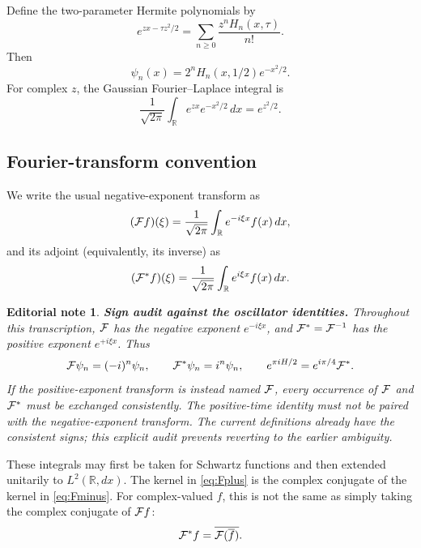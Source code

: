 \documentclass[11pt]{amsart}
\newcommand{\RR}{\mathbb R}
\newcommand{\F}{{\cal F}}
\newcommand{\Fstar}{{\cal F}^{*}}
\newcommand{\dd}{\,dx}
\newtheorem*{editorial}{Editorial note}
\begin{document}
Define the two-parameter Hermite polynomials by
\begin{equation}\label{eq:Hermite-polynomials}
e^{zx-\tau z^2/2}
=\sum_{n\ge0}\frac{z^n H_n(x,\tau)}{n!}.
\end{equation}
Then
\[
\psi_n(x)=2^nH_n(x,1/2)e^{-x^2/2}.
\]
For complex $z$, the Gaussian Fourier--Laplace integral is
\[
\frac1{\sqrt{2\pi}}\int_{\RR}e^{zx}e^{-x^2/2}\dd=e^{z^2/2}.
\]

\subsection*{Fourier-transform convention}
We write the usual negative-exponent transform as
\begin{equation}\label{eq:Fminus}
(\F f)(\xi)=\frac1{\sqrt{2\pi}}
\int_{\RR}e^{-i\xi x}f(x)\dd,
\end{equation}
and its adjoint (equivalently, its inverse) as
\begin{equation}\label{eq:Fplus}
(\Fstar f)(\xi)=\frac1{\sqrt{2\pi}}
\int_{\RR}e^{i\xi x}f(x)\dd.
\end{equation}
\begin{editorial}
\textbf{Sign audit against the oscillator identities.}
Throughout this transcription, $\F$ has the negative exponent
$e^{-i\xi x}$, and $\Fstar=\F^{-1}$ has the positive exponent
$e^{+i\xi x}$. Thus
\[
 \F\psi_n=(-i)^n\psi_n,\qquad
 \Fstar\psi_n=i^n\psi_n,\qquad
 e^{\pi iH/2}=e^{i\pi/4}\Fstar.
\]
If the positive-exponent transform is instead named $\F$, every
occurrence of $\F$ and $\Fstar$ must be exchanged consistently.
The positive-time identity must not be paired with the negative-exponent
transform. The current definitions already have the consistent signs;
this explicit audit prevents reverting to the earlier ambiguity.
\end{editorial}
These integrals may first be taken for Schwartz functions and then
extended unitarily to $L^2(\RR,dx)$.
The kernel in \eqref{eq:Fplus} is the complex conjugate of the kernel
in \eqref{eq:Fminus}. For complex-valued $f$, this is not the same as
simply taking the complex conjugate of $\F f$:
\[
\Fstar f=\overline{\F(\overline f)}.
\]
\end{document}

